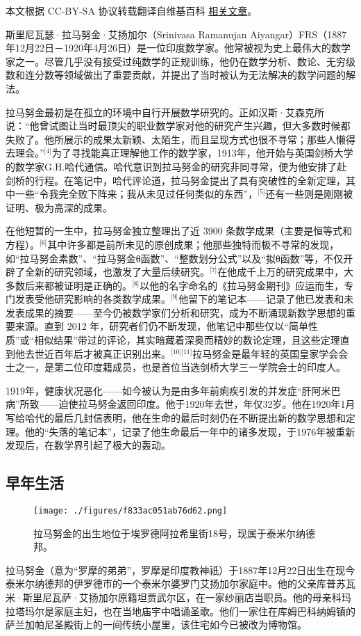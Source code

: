
本文根据 CC-BY-SA 协议转载翻译自维基百科 \href{https://en.wikipedia.org/wiki/Srinivasa_Ramanujan}{相关文章}。

斯里尼瓦瑟·拉马努金·艾扬加尔（Srinivasa Ramanujan Aiyangar）FRS（1887年12月22日－1920年4月26日）是一位印度数学家。他常被视为史上最伟大的数学家之一。尽管几乎没有接受过纯数学的正规训练，他仍在数学分析、数论、无穷级数和连分数等领域做出了重要贡献，并提出了当时被认为无法解决的数学问题的解法。

拉马努金最初是在孤立的环境中自行开展数学研究的。正如汉斯·艾森克所说：“他曾试图让当时最顶尖的职业数学家对他的研究产生兴趣，但大多数时候都失败了。他所展示的成果太新颖、太陌生，而且呈现方式也很不寻常；那些人懒得去理会。”\(^\text{[4]}\)为了寻找能真正理解他工作的数学家，1913年，他开始与英国剑桥大学的数学家G.H.哈代通信。哈代意识到拉马努金的研究非同寻常，便为他安排了赴剑桥的行程。在笔记中，哈代评论道，拉马努金提出了具有突破性的全新定理，其中一些“令我完全败下阵来；我从未见过任何类似的东西”，\(^\text{[5]}\)还有一些则是刚刚被证明、极为高深的成果。

在他短暂的一生中，拉马努金独立整理出了近 3900 条数学成果（主要是恒等式和方程）。\(^\text{[6]}\)其中许多都是前所未见的原创成果；他那些独特而极不寻常的发现，如“拉马努金素数”、“拉马努金θ函数”、“整数划分公式”以及“拟θ函数”等，不仅开辟了全新的研究领域，也激发了大量后续研究。\(^\text{[7]}\)在他成千上万的研究成果中，大多数后来都被证明是正确的。\(^\text{[8]}\)以他的名字命名的《拉马努金期刊》应运而生，专门发表受他研究影响的各类数学成果。\(^\text{[9]}\)他留下的笔记本——记录了他已发表和未发表成果的摘要——至今仍被数学家们分析和研究，成为不断涌现新数学思想的重要来源。直到 2012 年，研究者们仍不断发现，他笔记中那些仅以“简单性质”或“相似结果”带过的评论，其实暗藏着深奥而精妙的数论定理，且这些定理直到他去世近百年后才被真正识别出来。\(^\text{[10][11]}\)拉马努金是最年轻的英国皇家学会会士之一，是第二位印度籍成员，也是首位当选剑桥大学三一学院会士的印度人。

1919年，健康状况恶化——如今被认为是由多年前痢疾引发的并发症“肝阿米巴病”所致——迫使拉马努金返回印度。他于1920年去世，年仅32岁。他在1920年1月写给哈代的最后几封信表明，他在生命的最后时刻仍在不断提出新的数学思想和定理。他的“失落的笔记本”，记录了他生命最后一年中的诸多发现，于1976年被重新发现后，在数学界引起了极大的轰动。
\subsection{早年生活}
\begin{figure}[ht]
\centering
\texttt{[image: ./figures/f833ac051ab76d62.png]}
\caption{拉马努金的出生地位于埃罗德阿拉希里街18号，现属于泰米尔纳德邦。} \label{fig_LMLJ_1}
\end{figure}
拉马努金（意为“罗摩的弟弟”，罗摩是印度教神祇）于1887年12月22日出生在现今泰米尔纳德邦的伊罗德市的一个泰米尔婆罗门艾扬加尔家庭中。他的父亲库普苏瓦米·斯里尼瓦萨·艾扬加尔原籍坦贾武尔区，在一家纱丽店当职员。他的母亲科玛拉塔玛尔是家庭主妇，也在当地庙宇中唱诵圣歌。他们一家住在库姆巴科纳姆镇的萨兰加帕尼圣殿街上的一间传统小屋里，该住宅如今已被改为博物馆。

